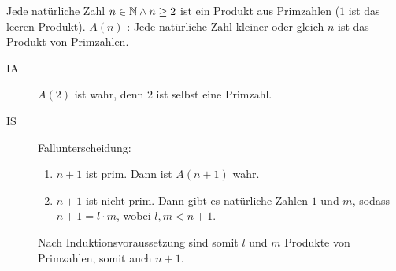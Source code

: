\satz{}
Jede natürliche Zahl $n\in\mathbb{N} \wedge n\geq2$ ist ein Produkt aus Primzahlen ($1$ ist das leeren Produkt).
\beweis
$A(n)$ : \glqq Jede natürliche Zahl kleiner oder gleich $n$ ist das Produkt von Primzahlen.\grqq

\begin{description}
  \item[IA] $A(2)$ ist wahr, denn $2$ ist selbst eine Primzahl.
  \item[IS] Fallunterscheidung:
  \begin{enumerate}
    \item $n+1$ ist prim. Dann ist $A(n+1)$ wahr.
    \item $n+1$ ist nicht prim. Dann gibt es natürliche Zahlen $1$ und $m$, sodass $n+1=l\cdot m$, wobei $l,m<n+1$.
  \end{enumerate}
  Nach Induktionsvoraussetzung sind somit $l$ und $m$ Produkte von Primzahlen, somit auch $n+1$.
\end{description}
